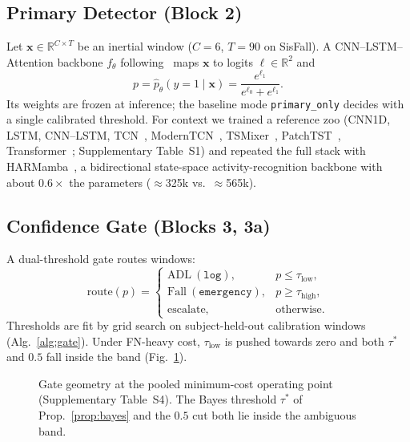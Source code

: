 \documentclass[journal]{IEEEtran}
\begin{document}


\subsection{Primary Detector (Block 2)}
Let $\mathbf{x}\in\mathbb{R}^{C\times T}$ be an inertial window ($C{=}6$, $T{=}90$ on SisFall). A CNN--LSTM--Attention backbone $f_\theta$ following~\cite{bhatti2025beyond} maps $\mathbf{x}$ to logits $\boldsymbol{\ell}\in\mathbb{R}^{2}$ and
\begin{equation}
p = \hat{p}_\theta(y{=}1\mid\mathbf{x}) = \frac{e^{\ell_1}}{e^{\ell_0}+e^{\ell_1}}.
\label{eq:pfall}
\end{equation}
Its weights are frozen at inference; the baseline mode \texttt{primary\_only} decides with a single calibrated threshold. For context we trained a reference zoo (CNN1D, LSTM, CNN--LSTM, TCN~\cite{bai2018tcn}, ModernTCN~\cite{iglesias2023modern}, TSMixer~\cite{tsmixer2023}, PatchTST~\cite{patchtst2023}, Transformer~\cite{vaswani2017attention}; Supplementary Table~S1) and repeated the full stack with HARMamba~\cite{li2025harmamba}, a bidirectional state-space activity-recognition backbone with about $0.6\times$ the parameters ($\approx$325k vs.\ $\approx$565k).

\subsection{Confidence Gate (Blocks 3, 3a)}
A dual-threshold gate routes windows:
\begin{equation}
\mathrm{route}(p)=
\begin{cases}
\mathrm{ADL}\ (\texttt{log}), & p \le \tau_{\mathrm{low}},\\
\mathrm{Fall}\ (\texttt{emergency}), & p \ge \tau_{\mathrm{high}},\\
\mathrm{escalate}, & \text{otherwise.}
\end{cases}
\label{eq:gate}
\end{equation}
Thresholds are fit by grid search on subject-held-out calibration windows (Alg.~\ref{alg:gate}). Under FN-heavy cost, $\tau_{\mathrm{low}}$ is pushed towards zero and both $\tau^\ast$ and $0.5$ fall inside the band (Fig.~\ref{fig:gateband}).

\begin{figure}[!t]
\centering
\resizebox{\linewidth}{!}{}
\caption{Gate geometry at the pooled minimum-cost operating point (Supplementary Table~S4). The Bayes threshold $\tau^\ast$ of Prop.~\ref{prop:bayes} and the $0.5$ cut both lie inside the ambiguous band.}
\label{fig:gateband}
\end{figure}
\end{document}
